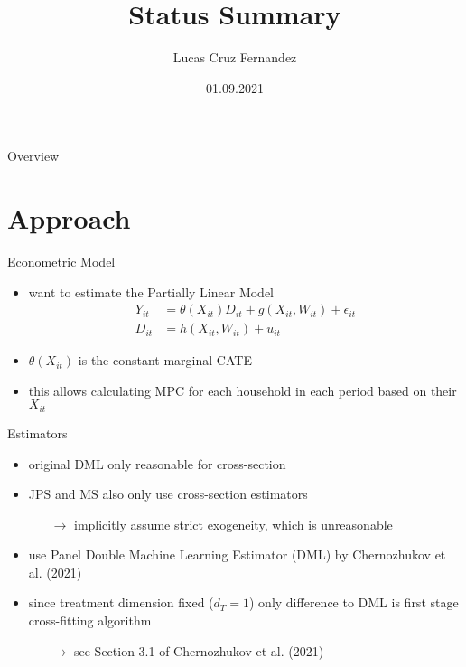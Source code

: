 \documentclass[a4paper, 12pt]{beamer}
\title{Status Summary}
\date{01.09.2021}
\author{Lucas Cruz Fernandez}
\begin{document}
\begin{frame}
    \maketitle
\end{frame}

\begin{frame}{Overview}
  \tableofcontents
\end{frame}

\section{Approach}
\begin{frame}{Econometric Model}
  \begin{itemize}
    \item want to estimate the Partially Linear Model
    \begin{align} 
    Y_{it}&=\theta(X_{it})D_{it}+g(X_{it}, W_{it})+\epsilon_{it} \\
    D_{it}&=h(X_{it}, W_{it})+u_{it}
    \end{align}
    \item $\theta(X_{it})$ is the constant marginal CATE
    \item this allows calculating MPC for each household in each period based on their $X_{it}$
  \end{itemize}
\end{frame}

\begin{frame}{Estimators}
  \begin{itemize}
    \item original DML only reasonable for cross-section
    \item JPS and MS also only use cross-section estimators
    \begin{itemize}
      \item[$\rightarrow$] implicitly assume strict exogeneity, which is unreasonable
    \end{itemize}
    \item use Panel Double Machine Learning Estimator (DML) by Chernozhukov et al. (2021)
    \item since treatment dimension fixed ($d_T=1$) only difference to DML is first stage cross-fitting algorithm 
    \begin{itemize}
      \item[$\rightarrow$] see Section 3.1 of Chernozhukov et al. (2021)
    \end{itemize}
  \end{itemize}
\end{frame}
\end{document}
